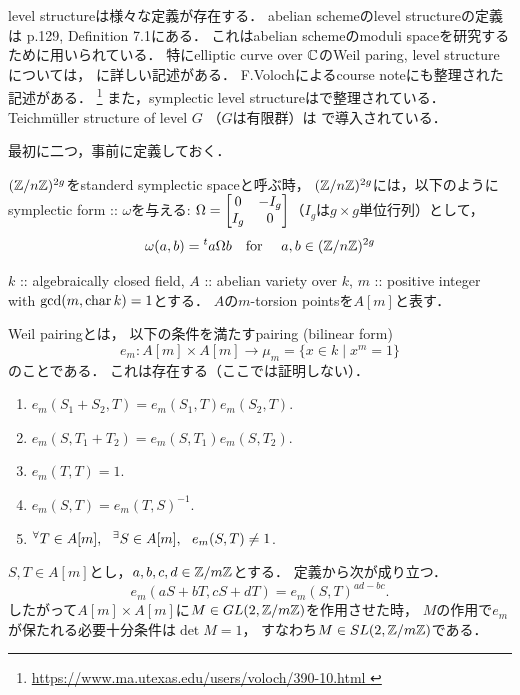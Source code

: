 \documentclass[a4paper]{jsarticle}
\begin{document}
    level structureは様々な定義が存在する．
    abelian schemeのlevel structureの定義は
    \cite{GIT} p.129, Definition 7.1にある．
    これはabelian schemeのmoduli spaceを研究するために用いられている．
    特にelliptic curve over $\mathbb{C}$のWeil paring, level structureについては，
    \cite{DiaShur}に詳しい記述がある．
    F.Volochによるcourse noteにも整理された記述がある．
    \footnote{\url{ https://www.ma.utexas.edu/users/voloch/390-10.html }}
    また，symplectic level structureは\cite{CFMSC}で整理されている．
    Teichm\"uller structure of level $G$ （$G$は有限群）は
    \cite{IrrOfMg}で導入されている．

    最初に二つ，事前に定義しておく．
    \begin{Def}
        $(\mathbb{Z}/n\mathbb{Z})^{2g}$をstanderd symplectic spaceと呼ぶ時，
        $(\mathbb{Z}/n\mathbb{Z})^{2g}$には，以下のようにsymplectic form :: $\omega$を与える:
        $\Omega=\begin{bmatrix}0 & -I_{g} \\ I_g & 0\end{bmatrix}$（$I_g$は$g \times g$単位行列）として，
        \[ \omega(a, b)={}^t a \Omega b \quad \text{for } \quad a,b \in (\mathbb{Z}/n\mathbb{Z})^{2g} \]
    \end{Def}

    \begin{Def}
        $k$ :: algebraically closed field,
        $A$ :: abelian variety over $k$,
        $m$ :: positive integer with $\gcd(m, \operatorname{char} k)=1$とする．
        $A$の$m$-torsion pointsを$A[m]$と表す．

        Weil pairingとは，
        以下の条件を満たすpairing (bilinear form) 
        \[ e_m: A[m] \times A[m] \to \mu_m=\{ x \in k \mid x^m=1 \} \]
        のことである．
        これは存在する（ここでは証明しない）．
        \begin{enumerate}[label=(\roman*), leftmargin=*]
            \item
                $e_m(S_1+S_2, T)=e_m(S_1,T) e_m(S_2,T)$.
            \item
                $e_m(S, T_1+T_2)=e_m(S,T_1) e_m(S,T_2)$.
            \item
                $e_m(T, T)=1$.
            \item
                $e_m(S, T)=e_m(T, S)^{-1}$.
            \item
                ${}^{\forall} T \in A[m],~~ {}^{\exists} S \in A[m],~~ e_m(S, T) \neq 1$.
        \end{enumerate}
    \end{Def}

    \begin{Remark}\label{remark:WeilPairingAndSL}
        $S, T \in A[m]$とし，$a,b,c,d \in \mathbb{Z}/m\mathbb{Z}$とする．
        定義から次が成り立つ．
        \[ e_m(a S+ b T, c S+ d T)=e_m(S, T)^{ad-bc}. \]
        したがって$A[m] \times A[m]$に$M \in GL(2, \mathbb{Z}/m\mathbb{Z})$を作用させた時，
        $M$の作用で$e_m$が保たれる必要十分条件は$\det M=1$，
        すなわち$M \in SL(2, \mathbb{Z}/m\mathbb{Z})$である．
    \end{Remark}
\end{document}
